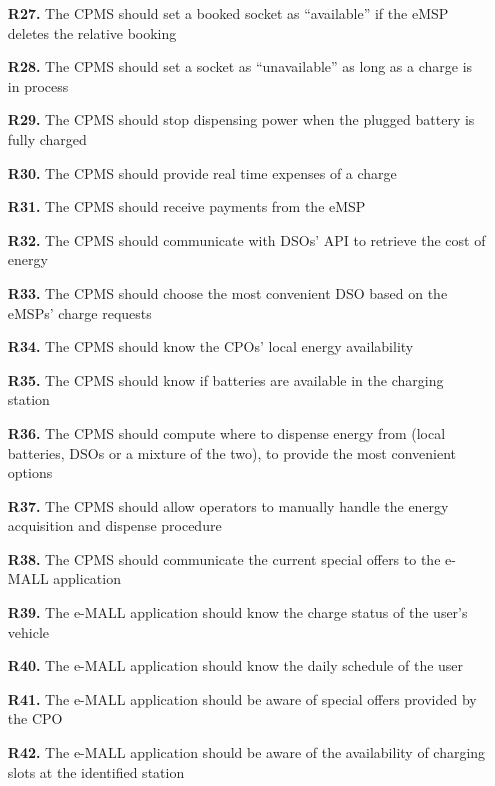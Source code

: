 \documentclass[12pt]{report}
\begin{document}
\begin{itemize}
    \item[\textbf{R27.}]The CPMS should set a booked socket as “available” if the eMSP deletes the relative booking
    
    \item[\textbf{R28.}]The CPMS should set a socket as “unavailable” as long as a charge is in process
    
    \item[\textbf{R29.}]The CPMS should stop dispensing power when the plugged battery is fully charged
    
    \item[\textbf{R30.}]The CPMS should provide real time expenses of a charge
    
    \item[\textbf{R31.}]The CPMS should receive payments from the eMSP
    
    \item[\textbf{R32.}]The CPMS should communicate with DSOs’ API to retrieve the cost of energy
    
    \item[\textbf{R33.}]The CPMS should choose the most convenient DSO based on the eMSPs’ charge requests
    
    \item[\textbf{R34.}]The CPMS should know the CPOs’ local energy availability 
    
    \item[\textbf{R35.}]The CPMS should know if batteries are available in the charging station
    
    \item[\textbf{R36.}]The CPMS should compute where to dispense energy from (local batteries, DSOs or a mixture of the two), to provide the most convenient options
    
    \item[\textbf{R37.}]The CPMS should allow operators to manually handle the energy acquisition and dispense procedure
    
    \item[\textbf{R38.}]The CPMS should communicate the current special offers to the e-MALL application
    
    \item[\textbf{R39.}]The e-MALL application should know the charge status of the user’s vehicle
    
    \item[\textbf{R40.}]The e-MALL application should know the daily schedule of the user
    
    \item[\textbf{R41.}]The e-MALL application should be aware of special offers provided by the CPO
    
    \item[\textbf{R42.}]The e-MALL application should be aware of the availability of charging slots at the identified station
\end{itemize}
\end{document}
